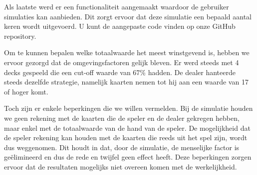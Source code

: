 \documentclass[11pt, final, journal, a4paper]{IEEEtran}
\begin{document}
Als laatste werd er een functionaliteit aangemaakt waardoor de gebruiker simulaties kan aanbieden. Dit zorgt ervoor dat deze simulatie een bepaald aantal keren wordt uitgevoerd. U kunt de aangepaste code vinden op onze GitHub repository. 

Om te kunnen bepalen welke totaalwaarde het meest winstgevend is, hebben we ervoor gezorgd dat de omgevingsfactoren gelijk bleven. Er werd steeds met 4 decks gespeeld die een cut-off waarde van 67\% hadden. De dealer hanteerde steeds dezelfde strategie, namelijk kaarten nemen tot hij aan een waarde van 17 of hoger komt. 

Toch zijn er enkele beperkingen die we willen vermelden. Bij de simulatie houden we geen rekening met de kaarten die de speler en de dealer gekregen hebben, maar enkel met de totaalwaarde van de hand van de speler. De mogelijkheid dat de speler rekening kan houden met de kaarten die reeds uit het spel zijn, wordt dus weggenomen. Dit houdt in dat, door de simulatie, de menselijke factor is geëlimineerd en dus de rede en twijfel geen effect heeft. Deze beperkingen zorgen ervoor dat de resultaten mogelijks niet overeen komen met de werkelijkheid.
\end{document}
